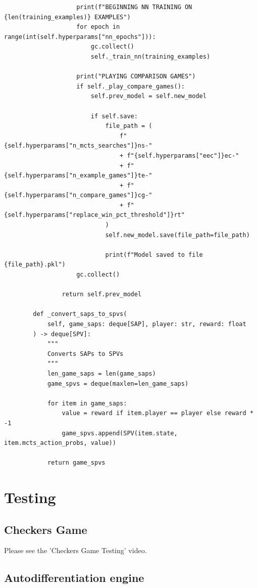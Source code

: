 \documentclass{article}
\begin{document}
\begin{verbatim}
                    print(f"BEGINNING NN TRAINING ON {len(training_examples)} EXAMPLES")
                    for epoch in range(int(self.hyperparams["nn_epochs"])):
                        gc.collect()
                        self._train_nn(training_examples)

                    print("PLAYING COMPARISON GAMES")
                    if self._play_compare_games():
                        self.prev_model = self.new_model

                        if self.save:
                            file_path = (
                                f"{self.hyperparams["n_mcts_searches"]}ns-"
                                + f"{self.hyperparams["eec"]}ec-"
                                + f"{self.hyperparams["n_example_games"]}te-"
                                + f"{self.hyperparams["n_compare_games"]}cg-"
                                + f"{self.hyperparams["replace_win_pct_threshold"]}rt"
                            )
                            self.new_model.save(file_path=file_path)

                            print(f"Model saved to file {file_path}.pkl")
                    gc.collect()

                return self.prev_model

        def _convert_saps_to_spvs(
            self, game_saps: deque[SAP], player: str, reward: float
        ) -> deque[SPV]:
            """
            Converts SAPs to SPVs
            """
            len_game_saps = len(game_saps)
            game_spvs = deque(maxlen=len_game_saps)

            for item in game_saps:
                value = reward if item.player == player else reward * -1
                game_spvs.append(SPV(item.state, item.mcts_action_probs, value))

            return game_spvs
    \end{verbatim}

    \section{Testing}
    \secttoc

    \subsection{Checkers Game}

    Please see the 'Checkers Game Testing' video.

    \subsection{Autodifferentiation engine}
\end{document}
